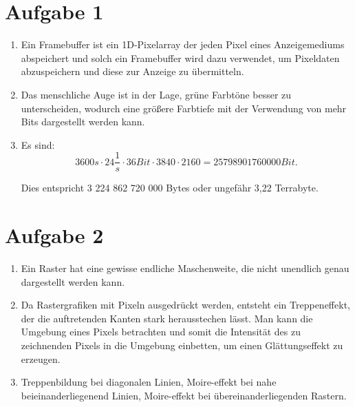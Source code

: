 \documentclass[11pt]{article}
\begin{document}
\section*{Aufgabe 1}
\begin{enumerate}
\item Ein Framebuffer ist ein 1D-Pixelarray der jeden Pixel eines Anzeigemediums abspeichert und solch ein Framebuffer wird dazu verwendet, um Pixeldaten abzuspeichern und diese zur Anzeige zu übermitteln.

\item Das menschliche Auge ist in der Lage, grüne Farbtöne besser zu unterscheiden, wodurch eine größere Farbtiefe mit der Verwendung von mehr Bits dargestellt werden kann.

\item Es sind:
  \begin{equation*}
    3600s \cdot 24 \frac{1}{s} \cdot 36 Bit \cdot 3840 \cdot 2160 = 25 798 901 760 000 Bit.
  \end{equation*}

  Dies entspricht 3 224 862 720 000 Bytes oder ungefähr 3,22 Terrabyte.

\end{enumerate}
\section*{Aufgabe 2}

\begin{enumerate}
\item Ein Raster hat eine gewisse endliche Maschenweite, die nicht unendlich genau dargestellt werden kann.

\item Da Rastergrafiken mit Pixeln ausgedrückt werden, entsteht ein Treppeneffekt, der die auftretenden Kanten stark herausstechen lässt. Man kann die Umgebung eines Pixels betrachten und somit die Intensität des zu zeichnenden Pixels in die Umgebung einbetten, um einen Glättungseffekt zu erzeugen.

\item Treppenbildung bei diagonalen Linien, Moire-effekt bei nahe beieinanderliegenend Linien, Moire-effekt bei übereinanderliegenden Rastern.
\end{enumerate}
\end{document}
